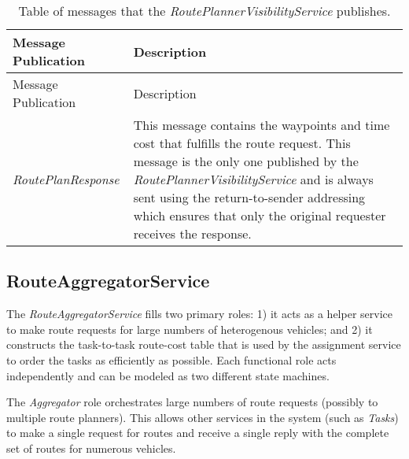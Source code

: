 \begin{longtable}[c]{@{}ll@{}}
\caption{Table of messages that the \emph{RoutePlannerVisibilityService}
publishes.}\tabularnewline
\toprule
\begin{minipage}[b]{0.29\columnwidth}\raggedright\strut
Message Publication
\strut\end{minipage} &
\begin{minipage}[b]{0.65\columnwidth}\raggedright\strut
Description
\strut\end{minipage}\tabularnewline
\midrule
\endfirsthead
\toprule
\begin{minipage}[b]{0.29\columnwidth}\raggedright\strut
Message Publication
\strut\end{minipage} &
\begin{minipage}[b]{0.65\columnwidth}\raggedright\strut
Description
\strut\end{minipage}\tabularnewline
\midrule
\endhead
\begin{minipage}[t]{0.29\columnwidth}\raggedright\strut
\emph{RoutePlanResponse}
\strut\end{minipage} &
\begin{minipage}[t]{0.65\columnwidth}\raggedright\strut
This message contains the waypoints and time cost that fulfills the
route request. This message is the only one published by the
\emph{RoutePlannerVisibilityService} and is always sent using the
return-to-sender addressing which ensures that only the original
requester receives the response.
\strut\end{minipage}\tabularnewline
\bottomrule
\end{longtable}

\subsection{RouteAggregatorService}\label{routeaggregatorservice}

The \emph{RouteAggregatorService} fills two primary roles: 1) it acts as
a helper service to make route requests for large numbers of
heterogenous vehicles; and 2) it constructs the task-to-task route-cost
table that is used by the assignment service to order the tasks as
efficiently as possible. Each functional role acts independently and can
be modeled as two different state machines.

The \emph{Aggregator} role orchestrates large numbers of route requests
(possibly to multiple route planners). This allows other services in the
system (such as \emph{Tasks}) to make a single request for routes and
receive a single reply with the complete set of routes for numerous
vehicles.

